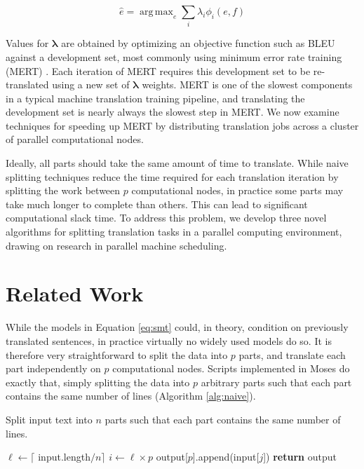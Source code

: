 \documentclass{pbml}
\DeclareMathOperator*{\argmax}{arg\,max}
\begin{document}
\begin{equation}
\hat{e} = \argmax_e \sum_i \lambda_i \phi_i(e,f)
\label{eq:smt}
\end{equation}


Values for $\bm{\lambda}$ are obtained by optimizing an objective function such as BLEU \citep{papinenietal01} against a development set, most commonly using minimum error rate training (MERT) \citep{och03}. Each iteration of MERT requires this development set to be re-translated using a new set of $\bm{\lambda}$ weights. MERT is one of the slowest components in a typical machine translation training pipeline, and translating the development set is nearly always the slowest step in MERT. We now examine techniques for speeding up MERT by distributing translation jobs across a cluster of parallel computational nodes. 

Ideally, all parts should take the same amount of time to translate. While naive splitting techniques reduce the time required for each translation iteration by splitting the work between $p$ computational nodes, in practice some parts may take much longer to complete than others. This can lead to significant computational slack time.
%
To address this problem, we develop three novel algorithms for splitting translation tasks in a parallel computing environment, drawing on research in parallel machine scheduling.





\section{Related Work}

While the models in Equation \ref{eq:smt} could, in theory, condition on previously translated sentences, in practice virtually no widely used models do so. It is therefore very straightforward to split the data into $p$ parts, and translate each part independently on $p$ computational nodes. Scripts implemented in Moses \citep{moses} do exactly that, simply splitting the data into $p$ arbitrary parts such that each part contains the same number of lines (Algorithm \ref{alg:naive}).

\begin{algorithm}
\caption{Split input text into $n$ parts such that each part contains the same number of lines.}
\begin{algorithmic}
\State $\ell \gets \lceil$ input.length$ / n\rceil$
\State $i \gets \ell \times p$
\State output[$p$].append(input[$j$])
\EndFor
\EndFor
\State \textbf{return} output
\EndFunction
\end{algorithmic}
\label{alg:naive}
\end{algorithm}
\end{document}
